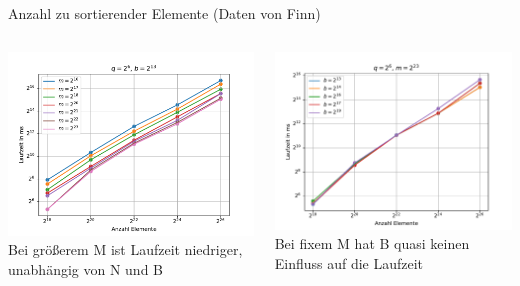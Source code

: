 \documentclass[ngerman,aspectratio=169,10pt]{beamer}
\begin{document}
\begin{frame}{Anzahl zu sortierender Elemente}
	\centering
	\vspace{-3px}
	(Daten von Finn)
	\vspace{2px}
	\begin{columns}
		\begin{column}{0.5\textwidth}
			\includegraphics[width=\textwidth]{Figure_4.pdf}
			Bei größerem M ist Laufzeit niedriger, unabhängig von N und B
		\end{column}
		\begin{column}{0.5\textwidth}
			\includegraphics[width=\textwidth]{Figure_5.pdf}
			Bei fixem M hat B quasi keinen Einfluss auf die Laufzeit
		\end{column}
	\end{columns}
\end{frame}
\end{document}
